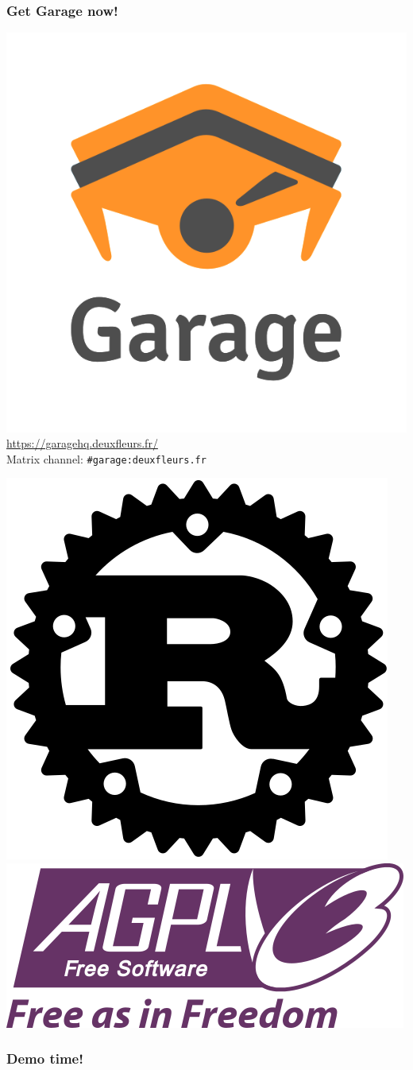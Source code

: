 \documentclass[aspectratio=169]{beamer}
\begin{document}
\begin{frame}
	\frametitle{Get Garage now!}
	\begin{center}
			\includegraphics[width=.3\linewidth]{../../logo/garage_hires.png}\\
			\vspace{-1em}
		\url{https://garagehq.deuxfleurs.fr/}\\
		Matrix channel: \texttt{\#garage:deuxfleurs.fr}

		\vspace{2em}
			\includegraphics[width=.09\linewidth]{assets/rust_logo.png}
			\includegraphics[width=.2\linewidth]{assets/AGPLv3_Logo.png}
	\end{center}
\end{frame}

\begin{frame}
	\frametitle{Demo time!}
\end{frame}
\end{document}

